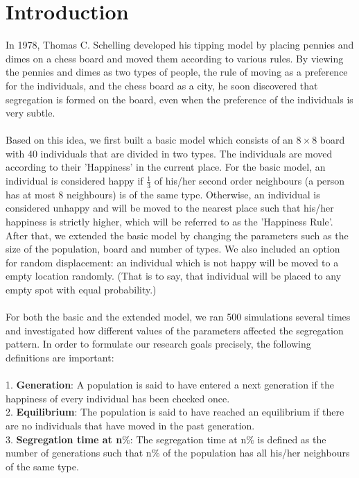 \section{Introduction}
In 1978, Thomas C. Schelling developed his tipping model by placing pennies and dimes on a chess board and moved them according to various rules. By viewing the pennies and dimes as two types of people, the rule of moving as a preference for the individuals, and the chess board as a city, he soon discovered that segregation is formed on the board, even when the preference of the individuals is very subtle.\\
\\
Based on this idea, we first built a basic model which consists of an $8\times8$ board with 40 individuals that are divided in two types. The individuals are moved according to their 'Happiness' in the current place. For the basic model, an individual is considered happy if $\frac{1}{3}$ of his/her second order neighbours (a person has at most 8 neighbours) is of the same type. Otherwise, an individual is considered unhappy and will be moved to the nearest place such that his/her happiness is strictly higher, which will be referred to as the 'Happiness Rule'. After that, we extended the basic model by changing the parameters such as the size of the population, board and number of types. We also included an option for random displacement: an individual which is not happy will be moved to a empty location randomly. (That is to say, that individual will be placed to any empty spot with equal probability.)\\\\
For both the basic and the extended model, we ran 500 simulations several times and investigated how different values of the parameters affected the segregation pattern. In order to formulate our research goals precisely, the following definitions are important:\\
\\
1. \textbf{Generation}: A population is said to have entered a next generation if the happiness of every individual has been checked once. \\
2. \textbf{Equilibrium}: The population is said to have reached an equilibrium if there are no individuals that have moved in the past generation.\\
3. \textbf{Segregation time at n$\%$}: The segregation time at n$\%$ is defined as the number of generations such that n$\%$ of the population has all his/her neighbours of the same type.
\\
